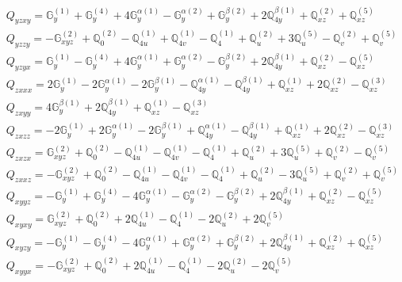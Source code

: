 \documentclass[fleqn,8pt,landscape]{jsarticle}
\begin{document}
\begin{align*}
& Q_{yzxy} = \mathbb{G}_{y}^{(1)} + \mathbb{G}_{y}^{(4)} + 4 \mathbb{G}_{y}^{\alpha(1)} - \mathbb{G}_{y}^{\alpha(2)} + \mathbb{G}_{y}^{\beta(2)} + 2 \mathbb{Q}_{4y}^{\beta(1)} + \mathbb{Q}_{xz}^{(2)} + \mathbb{Q}_{xz}^{(5)} \\
& Q_{yzzy} = - \mathbb{G}_{xyz}^{(2)} + \mathbb{Q}_{0}^{(2)} - \mathbb{Q}_{4u}^{(1)} + \mathbb{Q}_{4v}^{(1)} - \mathbb{Q}_{4}^{(1)} + \mathbb{Q}_{u}^{(2)} + 3 \mathbb{Q}_{u}^{(5)} - \mathbb{Q}_{v}^{(2)} + \mathbb{Q}_{v}^{(5)} \\
& Q_{yzyx} = \mathbb{G}_{y}^{(1)} - \mathbb{G}_{y}^{(4)} + 4 \mathbb{G}_{y}^{\alpha(1)} + \mathbb{G}_{y}^{\alpha(2)} - \mathbb{G}_{y}^{\beta(2)} + 2 \mathbb{Q}_{4y}^{\beta(1)} + \mathbb{Q}_{xz}^{(2)} - \mathbb{Q}_{xz}^{(5)} \\
& Q_{zxxx} = 2 \mathbb{G}_{y}^{(1)} - 2 \mathbb{G}_{y}^{\alpha(1)} - 2 \mathbb{G}_{y}^{\beta(1)} - \mathbb{Q}_{4y}^{\alpha(1)} - \mathbb{Q}_{4y}^{\beta(1)} + \mathbb{Q}_{xz}^{(1)} + 2 \mathbb{Q}_{xz}^{(2)} - \mathbb{Q}_{xz}^{(3)} \\
& Q_{zxyy} = 4 \mathbb{G}_{y}^{\beta(1)} + 2 \mathbb{Q}_{4y}^{\beta(1)} + \mathbb{Q}_{xz}^{(1)} - \mathbb{Q}_{xz}^{(3)} \\
& Q_{zxzz} = - 2 \mathbb{G}_{y}^{(1)} + 2 \mathbb{G}_{y}^{\alpha(1)} - 2 \mathbb{G}_{y}^{\beta(1)} + \mathbb{Q}_{4y}^{\alpha(1)} - \mathbb{Q}_{4y}^{\beta(1)} + \mathbb{Q}_{xz}^{(1)} + 2 \mathbb{Q}_{xz}^{(2)} - \mathbb{Q}_{xz}^{(3)} \\
& Q_{zxzx} = \mathbb{G}_{xyz}^{(2)} + \mathbb{Q}_{0}^{(2)} - \mathbb{Q}_{4u}^{(1)} - \mathbb{Q}_{4v}^{(1)} - \mathbb{Q}_{4}^{(1)} + \mathbb{Q}_{u}^{(2)} + 3 \mathbb{Q}_{u}^{(5)} + \mathbb{Q}_{v}^{(2)} - \mathbb{Q}_{v}^{(5)} \\
& Q_{zxxz} = - \mathbb{G}_{xyz}^{(2)} + \mathbb{Q}_{0}^{(2)} - \mathbb{Q}_{4u}^{(1)} - \mathbb{Q}_{4v}^{(1)} - \mathbb{Q}_{4}^{(1)} + \mathbb{Q}_{u}^{(2)} - 3 \mathbb{Q}_{u}^{(5)} + \mathbb{Q}_{v}^{(2)} + \mathbb{Q}_{v}^{(5)} \\
& Q_{xyyz} = - \mathbb{G}_{y}^{(1)} + \mathbb{G}_{y}^{(4)} - 4 \mathbb{G}_{y}^{\alpha(1)} - \mathbb{G}_{y}^{\alpha(2)} - \mathbb{G}_{y}^{\beta(2)} + 2 \mathbb{Q}_{4y}^{\beta(1)} + \mathbb{Q}_{xz}^{(2)} - \mathbb{Q}_{xz}^{(5)} \\
& Q_{xyxy} = \mathbb{G}_{xyz}^{(2)} + \mathbb{Q}_{0}^{(2)} + 2 \mathbb{Q}_{4u}^{(1)} - \mathbb{Q}_{4}^{(1)} - 2 \mathbb{Q}_{u}^{(2)} + 2 \mathbb{Q}_{v}^{(5)} \\
& Q_{xyzy} = - \mathbb{G}_{y}^{(1)} - \mathbb{G}_{y}^{(4)} - 4 \mathbb{G}_{y}^{\alpha(1)} + \mathbb{G}_{y}^{\alpha(2)} + \mathbb{G}_{y}^{\beta(2)} + 2 \mathbb{Q}_{4y}^{\beta(1)} + \mathbb{Q}_{xz}^{(2)} + \mathbb{Q}_{xz}^{(5)} \\
& Q_{xyyx} = - \mathbb{G}_{xyz}^{(2)} + \mathbb{Q}_{0}^{(2)} + 2 \mathbb{Q}_{4u}^{(1)} - \mathbb{Q}_{4}^{(1)} - 2 \mathbb{Q}_{u}^{(2)} - 2 \mathbb{Q}_{v}^{(5)}
\end{align*}
\end{document}
